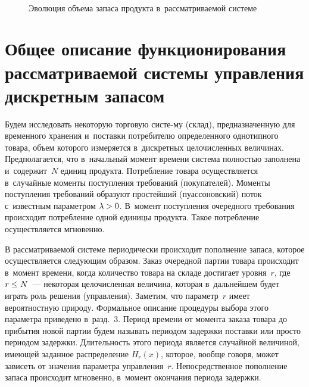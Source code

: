 \begin{multicols}{2}
  \begin{figure*} %
  \vspace*{1pt}
    \begin{center}  
  \mbox{%
 \epsfxsize=125.902mm 
 }

\vspace*{6pt}

  {\small Эволюция объема запаса продукта в~рассматриваемой системе}
  \end{center}
  \vspace*{-14pt}
  \end{figure*}


\section{Общее описание функционирования 
рассматриваемой системы управления дискретным запасом}

  Будем исследовать некоторую торговую систе-\linebreak му (склад), предназначенную 
для временного хранения и~поставки потребителю определенного однотипного 
товара, объем которого измеряется в~дискретных целочисленных величинах. 
Предполагается, что в~начальный момент времени сис\-те\-ма пол\-ностью 
заполнена и~содержит~$N$ единиц продукта. Потребление товара 
осуществляется в~случайные моменты поступления требований (покупателей). 
Моменты поступления требований образуют прос\-тей\-ший (пуассоновский) 
поток с~известным па\-ра\-мет\-ром $\lambda\hm>0$. В~момент по\-ступ\-ле\-ния 
очередного требования происходит потребление одной единицы продукта. 
Такое по\-треб\-ле\-ние осуществляется мгновенно.
  
  В рассматриваемой системе периодически происходит пополнение запаса, 
которое осуществляется сле\-ду\-ющим образом. Заказ очередной партии товара 
происходит в~момент времени, когда количество товара на складе достигает 
уровня~$r$, где $r\hm\leq N$~--- некоторая целочисленная величина, которая 
в~дальнейшем будет играть роль решения (управ\-ле\-ния). Заметим, что 
параметр~$r$ имеет вероятностную природу. Формальное описание процедуры 
выбора этого параметра приведено в~разд.~3. Период времени от момента 
заказа товара до прибытия новой партии будем называть периодом задержки 
по\-став\-ки или просто периодом задержки. Длительность этого периода является 
случайной величиной, имеющей заданное распределение $H_r(x)$, которое, 
вообще говоря, может зависеть от значения па\-ра\-мет\-ра управ\-ле\-ния~$r$. 
Непосредственное пополнение запаса происходит мгновенно, в~момент 
окончания периода задержки.
  

\end{multicols}

